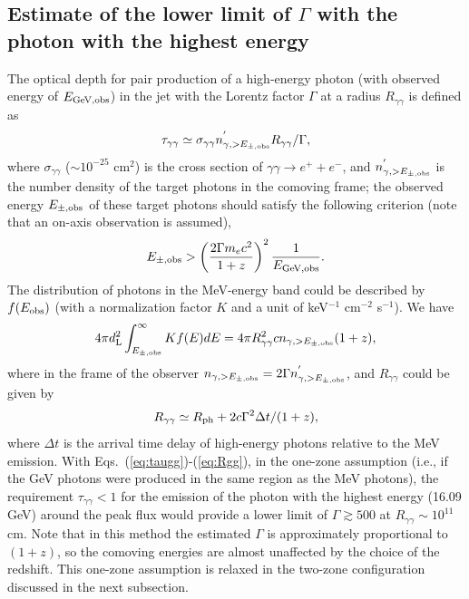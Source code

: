 \documentclass[prd,twocolumn,amsmath,amssymb,aps,linenumbers]{revtex4-2} %
\begin{document}
\subsection{Estimate of the lower limit of $\Gamma$ with the photon with the highest energy}
\label{sec:gammalowlimit}
 The optical depth for pair production of a high-energy photon (with observed energy of $E_{\rm GeV, obs}$) in the jet with the Lorentz factor $\Gamma$ at a radius $R_{\gamma\gamma}$ is defined as
\begin{equation}\label{eq:taugg}
\tau_{\gamma\gamma}\simeq \sigma_{\gamma\gamma} n^{'}_{\gamma, >E_{\pm, \rm obs}}R_{\gamma\gamma} /\Gamma,
\end{equation}
 where $\sigma_{\gamma\gamma}$ ($\sim10^{-25}$ cm$^{2}$) is the cross section of $\gamma\gamma\rightarrow e^{+}+e^{-}$, and $n^{'}_{\gamma, >E_{\pm,\rm obs}}$ is the number density of the target photons in the comoving frame; the observed energy $E_{\pm, \rm obs}$ of these target photons should satisfy the following criterion (note that an on-axis observation is assumed),
\begin{equation}\label{eq:Eobs}
 E_{\pm, \rm obs}>\left(\frac{2\Gamma m_ec^2}{1+z}\right)^2\frac{1}{E_{\rm GeV, obs}}.
\end{equation}
The distribution of photons in the MeV-energy band could be described by $f(E_{\rm obs})$ (with a normalization factor $K$ and a unit of keV$^{-1}$ cm$^{-2}$ s$^{-1}$). We have %
\begin{eqnarray}\label{eq:Eobs2}
     4\pi d^2_{\rm L}\int_{E_{\pm,\rm obs}}^\infty Kf(E)dE =4\pi R_{\gamma\gamma}^2 c n_{\gamma, >E_{\pm,\rm obs}}(1+z),
\end{eqnarray}
where in the frame of the observer $n_{\gamma, >E_{\pm,\rm obs}}=2\Gamma n^{'}_{\gamma, >E_{\pm,\rm obs}}$, and $R_{\gamma\gamma}$ could be given by
\begin{equation}\label{eq:Rgg}
   R_{\gamma\gamma}\simeq R_{\rm ph} +2c\Gamma^2\Delta t/(1+z),
\end{equation}
where $\Delta t$ is the arrival time delay of high-energy photons relative to the MeV emission.
With Eqs.~(\ref{eq:taugg})-(\ref{eq:Rgg}), in the one-zone assumption (i.e., if the GeV photons were produced in the same region as the MeV photons), the requirement $\tau_{\gamma\gamma}<1$ for the emission of the photon with the highest energy (16.09 GeV) around the peak flux would provide a lower limit of $\Gamma\gtrsim500$ at $R_{\gamma\gamma}\sim10^{11}$ cm. Note that in this method the estimated $\Gamma$ is approximately proportional to $(1+z)$, so the comoving energies are almost unaffected by the choice of the redshift. This one-zone assumption is relaxed in the two-zone configuration discussed in the next subsection.
\end{document}
